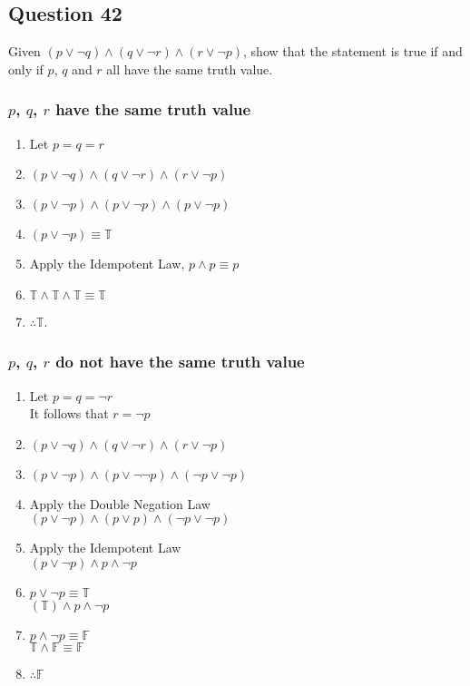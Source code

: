 \documentclass[12pt]{article}
\begin{document}
\subsection*{Question 42}
Given $(p \lor \neg q) \land (q \lor \neg r) \land (r \lor \neg p)$, show that
the statement is true if and only if $p$, $q$ and $r$ all have the same truth
value.

\subsubsection*{$p$, $q$, $r$ have the same truth value}

\begin{enumerate}
  \item Let $p=q=r$
  \item $(p \lor \neg q) \land (q \lor \neg r) \land (r \lor \neg p)$
  \item $(p \lor \neg p) \land (p \lor \neg p) \land (p \lor \neg p)$
  \item $(p \lor \neg p) \equiv \mathbb{T} $
  \item Apply the Idempotent Law, $p \land p \equiv p$
  \item $\mathbb{T} \land \mathbb{T} \land \mathbb{T} \equiv \mathbb{T}$
  \item $\therefore \mathbb{T}$.
\end{enumerate}

\subsubsection*{$p$, $q$, $r$ do not have the same truth value}

\begin{enumerate}
  \item Let $p=q=\neg r$\\
  It follows that $r = \neg p$
  \item $(p \lor \neg q) \land (q \lor \neg r) \land (r \lor \neg p)$
  \item $(p \lor \neg p) \land (p \lor \neg \neg p) \land (\neg p \lor \neg p)$ 
  \item Apply the Double Negation Law \\
    $(p \lor \neg p) \land (p \lor p) \land (\neg p \lor \neg p)$
  \item Apply the Idempotent Law \\
    $(p \lor \neg p) \land p \land \neg p$
  \item $p \lor \neg p \equiv \mathbb{T} $\\
    $(\mathbb{T}) \land p \land \neg p$
  \item $p \land \neg p \equiv \mathbb{F} $ \\
    $\mathbb{T} \land \mathbb{F} \equiv \mathbb{F}$
  \item $\therefore \mathbb{F} $
\end{enumerate}
\end{document}
